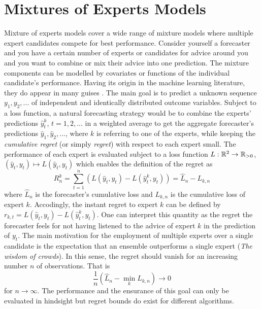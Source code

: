 \section{Mixtures of Experts Models}
\label{CH:ExpertModels}

Mixture of experts models cover a wide range of mixture models where multiple expert candidates compete for best performance. Consider yourself a forecaster and you have a certain number of experts or candidates for advice around you and you want to combine or mix their advice into one prediction. The mixture components can be modelled by covariates or functions of the individual candidate's performance.
Having its origin in the machine learning literature, they do appear in many guises \citep{gormley2018mixtures}. The main goal is to predict a unknown sequence $y_1, y_2, ... $ of independent and identically distributed outcome variables. Subject to a loss function, a natural forecasting strategy would be to combine the experts' predictions $\hat y_t^{k}$, $t = 1, 2, ...$ in a weighted average to get the aggregate forecaster's predictions $\hat y_1, \hat y_2, ...$, where $k$ is referring to one of the experts, while keeping the \textit{cumulative regret} (or simply \textit{regret}) with respect to each expert small. The performance of each expert is evaluated subject to a loss function $L: \mathbb{R}^2 \to \mathbb{R}_{>0}$, $(\hat y_t, y_t) \mapsto L(\hat y_t, y_t)$ which enables the definition of the regret as \citep{CesaBianchi2006PredictionLearningGames}
\begin{equation}
    R_n^k = \sum_{t=1}^{n} \left(L(\hat y_t, y_t)-L(\hat y_t^{k},y_t)\right) = \hat L_n - L_{k,n} \label{EQ:Regret}
\end{equation}
where $\hat L_n$ is the forecaster's cumulative loss and $L_{k,n}$ is the cumulative loss of expert $k$. Accodingly, the instant regret to expert $k$ can be defined by $r_{k,t} = L(\hat y_t, y_t)-L(\hat y_t^{k},y_t)$. One can interpret this quantity as the regret the forecaster feels for not having listened to the advice of expert $k$ in the prediction of $y_t$. The main motivation for the employment of multiple experts over a single candidate is the expectation that an ensemble outperforms a single expert (\textit{The wisdom of crowds}). In this sense, the regret should vanish for an increasing number $n$ of observations. That is
\begin{equation}
    \frac{1}{n}\left(\hat L_n - \min_{k} L_{k,n}\right) \to 0 
\end{equation}
for $n\to\infty$. The performance and the ensurance of this goal can only be evaluated in hindsight but regret bounds do exist for different algorithms.

